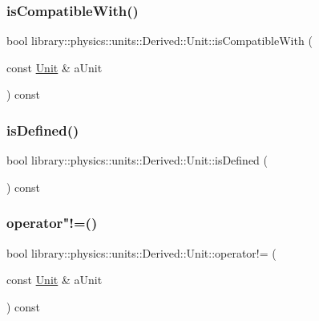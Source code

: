 \subsubsection{\texorpdfstring{is\+Compatible\+With()}{isCompatibleWith()}}
{\footnotesize\ttfamily bool library\+::physics\+::units\+::\+Derived\+::\+Unit\+::is\+Compatible\+With (\begin{DoxyParamCaption}\item[{const \hyperlink{classlibrary_1_1physics_1_1units_1_1_derived_1_1_unit}{Unit} \&}]{a\+Unit }\end{DoxyParamCaption}) const}

\mbox{\label{classlibrary_1_1physics_1_1units_1_1_derived_1_1_unit_adc1896bc12e75e2e8a08eb06cdcac434}} 
\subsubsection{\texorpdfstring{is\+Defined()}{isDefined()}}
{\footnotesize\ttfamily bool library\+::physics\+::units\+::\+Derived\+::\+Unit\+::is\+Defined (\begin{DoxyParamCaption}{ }\end{DoxyParamCaption}) const}

\mbox{\label{classlibrary_1_1physics_1_1units_1_1_derived_1_1_unit_abe02f07604a605c6f9c526599328bf37}} 
\subsubsection{\texorpdfstring{operator"!=()}{operator!=()}}
{\footnotesize\ttfamily bool library\+::physics\+::units\+::\+Derived\+::\+Unit\+::operator!= (\begin{DoxyParamCaption}\item[{const \hyperlink{classlibrary_1_1physics_1_1units_1_1_derived_1_1_unit}{Unit} \&}]{a\+Unit }\end{DoxyParamCaption}) const}


